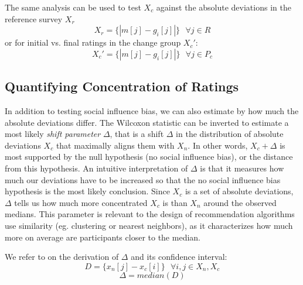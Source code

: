The same analysis can be used to test $X_c$ against the absolute deviations in the reference survey $X_r$
\begin{equation}
X_r = \{|m[j] - g_i[j]|\}\text{ }\forall j \in R
\end{equation} 
or for initial vs. final ratings in the change group $X_c'$:
\begin{equation}
X_c' = \{|m[j] - g_i[j]|\}\text{ }\forall j \in P_c
\end{equation}

\subsection{Quantifying Concentration of Ratings}
In addition to testing social influence bias, we can also estimate by how much the absolute deviations differ. 
The Wilcoxon statistic can be inverted to estimate a most likely \emph{shift parameter} $\Delta$, that is a shift $\Delta$ in the distribution of absolute deviations $X_c$ that maximally aligns them with $X_n$.
In other words, $X_c + \Delta$ is most supported by the null hypothesis (no social influence bias), or the distance from this hypothesis.
An intuitive interpretation of $\Delta$ is that it measures how much our deviations have to be increased so that the no social influence bias hypothesis is the most likely conclusion.
Since $X_c$ is a set of absolute deviations, $\Delta$ tells us how much more concentrated $X_c$ is than $X_n$ around the observed medians.
This parameter is relevant to the design of recommendation algorithms use similarity (eg. clustering or nearest neighbors), as it characterizes how much more on average are participants closer to the median.

We refer to \cite{lehmann2006nonparametrics} on the derivation of $\Delta$ and its confidence interval:
\begin{equation}
D = \{x_n[j] - x_c[i]\} \text{ } \forall i,j \in X_n, X_c
\end{equation}
\begin{equation}
\Delta = median(D)
\end{equation}




